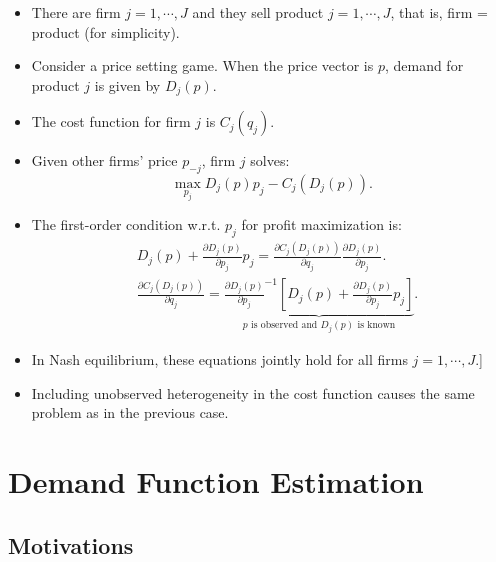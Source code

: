 \documentclass[
]{book}
\begin{document}
\begin{itemize}
\item
  There are firm \(j = 1, \cdots, J\) and they sell product \(j = 1, \cdots, J\), that is, firm = product (for simplicity).
\item
  Consider a price setting game. When the price vector is \(p\), demand for product \(j\) is given by \(D_j(p)\).
\item
  The cost function for firm \(j\) is \(C_j(q_j)\).
\item
  Given other firms' price \(p_{-j}\), firm \(j\) solves:
  \begin{equation}
  \max_{p_j} D_j(p) p_j - C_j(D_j(p)).
  \end{equation}
\item
  The first-order condition w.r.t. \(p_j\) for profit maximization is:
  \begin{equation}
  \begin{split}
  &D_j(p) + \frac{\partial D_j(p)}{\partial p_j} p_j = \frac{\partial C_j(D_j(p))}{\partial q_j} \frac{\partial D_j(p)}{\partial p_j}.\\
  &\frac{\partial C_j(D_j(p))}{\partial q_j} = \underbrace{\frac{\partial D_j(p)}{\partial p_j}^{-1}[D_j(p) + \frac{\partial D_j(p)}{\partial p_j} p_j ]}_{\text{$p$ is observed and $D_j(p)$ is known}}.
  \end{split}
  \end{equation}
\item
  In Nash equilibrium, these equations jointly hold for all firms \(j = 1, \cdots, J\).{]}
\item
  Including unobserved heterogeneity in the cost function causes the same problem as in the previous case.
\end{itemize}

\hypertarget{demand}{%
\chapter{Demand Function Estimation}\label{demand}}

\hypertarget{motivations}{%
\section{Motivations}\label{motivations}}
\end{document}
